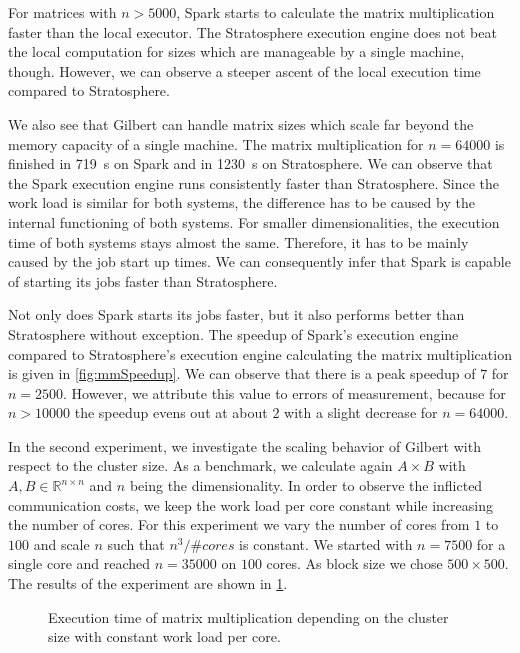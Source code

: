 For matrices with $n>5000$, Spark starts to calculate the matrix multiplication faster than the local executor.
The Stratosphere execution engine does not beat the local computation for sizes which are manageable by a single machine, though.
However, we can observe a steeper ascent of the local execution time compared to Stratosphere.

We also see that Gilbert can handle matrix sizes which scale far beyond the memory capacity of a single machine.
The matrix multiplication for $n=64000$ is finished in \SI{719}{\second} on Spark and in \SI{1230}{\second} on Stratosphere.
We can observe that the Spark execution engine runs consistently faster than Stratosphere.
Since the work load is similar for both systems, the difference has to be caused by the internal functioning of both systems.
For smaller dimensionalities, the execution time of both systems stays almost the same.
Therefore, it has to be mainly caused by the job start up times.
We can consequently infer that Spark is capable of starting its jobs faster than Stratosphere.

Not only does Spark starts its jobs faster, but it also performs better than Stratosphere without exception.
The speedup of Spark's execution engine compared to Stratosphere's execution engine calculating the matrix multiplication is given in \cref{fig:mmSpeedup}.
We can observe that there is a peak speedup of $7$ for $n=2500$.
However, we attribute this value to errors of measurement, because for $n>10000$ the speedup evens out at about $2$ with a slight decrease for $n=64000$.

In the second experiment, we investigate the scaling behavior of Gilbert with respect to the cluster size.
As a benchmark, we calculate again $A\times B$ with $A,B \in \mathbb{R}^{n\times n}$ and $n$ being the dimensionality.
In order to observe the inflicted communication costs, we keep the work load per core constant while increasing the number of cores.
For this experiment we vary the number of cores from $1$ to $100$ and scale $n$ such that $n^3/\#cores$ is constant.
We started with $n=7500$ for a single core and reached $n=35000$ on $100$ cores.
As block size we chose $500\times 500$.
The results of the experiment are shown in \cref{fig:mmNodesRuntime}.

\begin{figure}
	\centering
	\caption{Execution time of matrix multiplication depending on the cluster size with constant work load per core.}
	\label{fig:mmNodesRuntime}
\end{figure}

